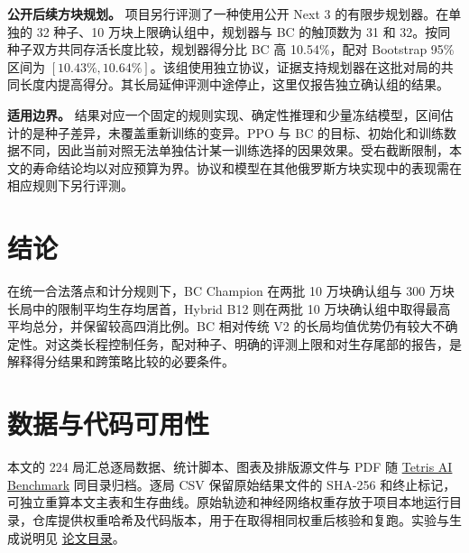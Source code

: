 \documentclass[UTF8,fontset=none,zihao=-4,a4paper]{ctexart}
\newcommand{\repo}{\href{https://github.com/u-wyh/tetris-ai-benchmark}{Tetris AI Benchmark}}
\newcommand{\1}{\mathbf{1}}
\begin{document}
\textbf{公开后续方块规划。} 项目另行评测了一种使用公开 Next 3 的有限步规划器。在单独的 32 种子、10 万块上限确认组中，规划器与 BC 的触顶数为 31 和 32。按同种子双方共同存活长度比较，规划器得分比 BC 高 10.54\%，配对 Bootstrap 95\% 区间为 $[10.43\%,10.64\%]$\cite{lookahead}。该组使用独立协议，证据支持规划器在这批对局的共同长度内提高得分。其长局延伸评测中途停止，这里仅报告独立确认组的结果。

\textbf{适用边界。} 结果对应一个固定的规则实现、确定性推理和少量冻结模型，区间估计的是种子差异，未覆盖重新训练的变异。PPO 与 BC 的目标、初始化和训练数据不同，因此当前对照无法单独估计某一训练选择的因果效果。受右截断限制，本文的寿命结论均以对应预算为界。协议和模型在其他俄罗斯方块实现中的表现需在相应规则下另行评测。

\section{结论}

在统一合法落点和计分规则下，BC Champion 在两批 10 万块确认组与 300 万块长局中的限制平均生存均居首，Hybrid B12 则在两批 10 万块确认组中取得最高平均总分，并保留较高四消比例。BC 相对传统 V2 的长局均值优势仍有较大不确定性。对这类长程控制任务，配对种子、明确的评测上限和对生存尾部的报告，是解释得分结果和跨策略比较的必要条件。

\section*{数据与代码可用性}

本文的 224 局汇总逐局数据、统计脚本、图表及排版源文件与 PDF 随 \repo{} 同目录归档。逐局 CSV 保留原始结果文件的 SHA-256 和终止标记，可独立重算本文主表和生存曲线。原始轨迹和神经网络权重存放于项目本地运行目录，仓库提供权重哈希及代码版本，用于在取得相同权重后核验和复跑。实验与生成说明见
\href{https://github.com/u-wyh/tetris-ai-benchmark/tree/codex/hardware-safe-autonomy/reports/paper}{论文目录}。
\end{document}
